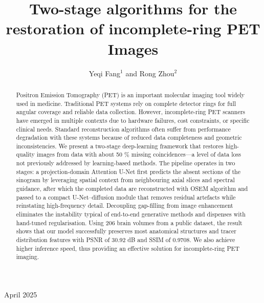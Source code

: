 \documentclass[12pt]{iopart}
\begin{document}
\title{Two-stage algorithms for the restoration of incomplete-ring PET Images}


\author{Yeqi Fang$^1$ and Rong Zhou$^2$}
\address{College of Physics, Sichuan University, Chengdu, 610065, China}

\vspace{10pt}
\begin{indented}
\item[]April 2025
\end{indented}

\begin{abstract}
Positron Emission Tomography (PET) is an important molecular imaging tool widely used in medicine. Traditional PET systems rely on complete detector rings for full angular coverage and reliable data collection. 
However, incomplete-ring PET scanners have emerged in multiple contexts due to hardware failures, cost constraints, or specific clinical needs. Standard reconstruction algorithms often suffer from performance degradation with these systems because of reduced data completeness and geometric inconsistencies.
We present a two-stage deep-learning framework that restores high-quality images from data with about 50 \% missing coincidences—a level of data loss not previously addressed by learning-based methods.
The pipeline operates in two stages: a projection-domain Attention U-Net first predicts the absent sections of the sinogram by leveraging spatial context from neighbouring axial slices and spectral guidance, after which the completed data are reconstructed with OSEM algorithm and passed to a compact U-Net–diffusion module that removes residual artefacts while reinstating high-frequency detail.
Decoupling gap-filling from image enhancement eliminates the instability typical of end-to-end generative methods and dispenses with hand-tuned regularisation.
Using 206 brain volumes from a public dataset, the result shows that our model successfully preserves most anatomical structures and tracer distribution features with PSNR of 30.92 dB and SSIM of 0.9708. We also achieve higher inference speed, thus providing an effective solution for incomplete-ring PET imaging.


\end{abstract}

%
%
%
% 
%
\end{document}
